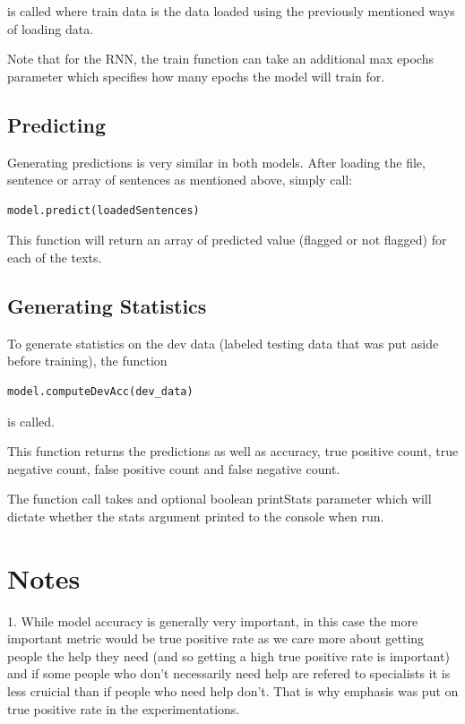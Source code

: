 \documentclass[twoside,twocolumn]{article}
\begin{document}
is called where train data is the data loaded using the previously mentioned ways of loading data.

Note that for the RNN, the train function can take an additional max epochs parameter which specifies
how many epochs the model will train for.

\subsection{Predicting}

Generating predictions is very similar in both models. After loading the file, sentence or array of sentences
as mentioned above, simply call:

\begin{lstlisting}
model.predict(loadedSentences)
\end{lstlisting}

This function will return an array of predicted value (flagged or not flagged) for each of the texts.


\subsection{Generating Statistics}

To generate statistics on the dev data (labeled testing data that was put aside before training),
the function
\begin{lstlisting}
model.computeDevAcc(dev_data)
\end{lstlisting}
is called.

This function returns the predictions as well as accuracy, true positive count, true negative count,
 false positive count and false negative count.

The function call takes and optional boolean printStats parameter which will dictate whether the stats argument
printed to the console when run.

\section{Notes} 

1. While model accuracy is generally very important, in this case the more important metric
would be true positive rate as we care more about getting people the help they need (and so
getting a high true  positive rate is important) and if some people who don't necessarily need
help are refered to specialists it is less cruicial than if people who need help don't. That
is why emphasis was put on true positive rate in the experimentations.
\end{document}
